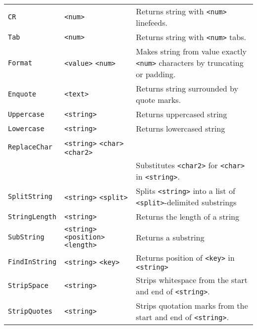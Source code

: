 \begin{longtable}{p{3cm}p{3cm}p{6cm}}
\verb+CR+ &\verb+<num>+ & Returns string with  \verb+<num>+ linefeeds.\\
\verb+Tab+ &\verb+<num>+ & Returns string with  \verb+<num>+ tabs.\\
\verb+Format+ &\verb+<value>+ \verb+<num>+ & Makes string from value
exactly \verb+<num>+ characters by truncating or padding.\\
\verb+Enquote+ &\verb+<text>+ & Returns string surrounded by quote marks.\\
\verb+Uppercase+ &\verb+<string>+ & Returns uppercased string\\ 
\verb+Lowercase+ &\verb+<string>+ & Returns lowercased string\\ 
\verb+ReplaceChar+&\verb+<string>+ \verb+<char>+ \verb+<char2>+\\
& & Substitutes  \verb+<char2>+ for \verb+<char>+ in \verb+<string>+.\\
\verb+SplitString+ &\verb+<string>+ \verb+<split>+ & Splits \verb+<string>+ into a list of \verb+<split>+-delimited substrings \\ 
\verb+StringLength+ &\verb+<string>+ & Returns the length of a string\\ 
\verb+SubString+ &\verb+<string>+ \verb+<position>+ \verb+<length>+& Returns a substring\\ 
\verb+FindInString+ &\verb+<string>+ \verb+<key>+ & Returns position
of \verb+<key>+ in \verb+<string>+\\ 
\verb+StripSpace+ &\verb+<string>+  & Strips whitespace from the start and end of \verb+<string>+.\\ 
\verb+StripQuotes+ &\verb+<string>+  & Strips quotation marks from the start and end of \verb+<string>+.\\ 


\end{longtable} 


